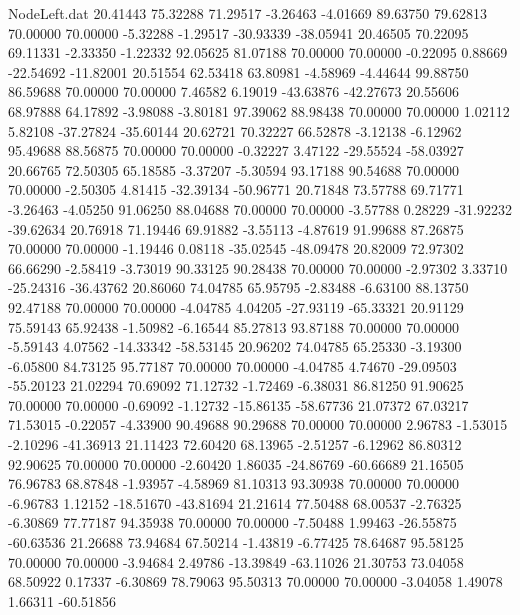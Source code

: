 \begin{filecontents}{NodeLeft.dat}
  20.41443   75.32288   71.29517    -3.26463   -4.01669   89.63750   79.62813   70.00000   70.00000   -5.32288   -1.29517  -30.93339  -38.05941
  20.46505   70.22095   69.11331    -2.33350   -1.22332   92.05625   81.07188   70.00000   70.00000   -0.22095    0.88669  -22.54692  -11.82001
  20.51554   62.53418   63.80981    -4.58969   -4.44644   99.88750   86.59688   70.00000   70.00000    7.46582    6.19019  -43.63876  -42.27673
  20.55606   68.97888   64.17892    -3.98088   -3.80181   97.39062   88.98438   70.00000   70.00000    1.02112    5.82108  -37.27824  -35.60144
  20.62721   70.32227   66.52878    -3.12138   -6.12962   95.49688   88.56875   70.00000   70.00000   -0.32227    3.47122  -29.55524  -58.03927
  20.66765   72.50305   65.18585    -3.37207   -5.30594   93.17188   90.54688   70.00000   70.00000   -2.50305    4.81415  -32.39134  -50.96771
  20.71848   73.57788   69.71771    -3.26463   -4.05250   91.06250   88.04688   70.00000   70.00000   -3.57788    0.28229  -31.92232  -39.62634
  20.76918   71.19446   69.91882    -3.55113   -4.87619   91.99688   87.26875   70.00000   70.00000   -1.19446    0.08118  -35.02545  -48.09478
  20.82009   72.97302   66.66290    -2.58419   -3.73019   90.33125   90.28438   70.00000   70.00000   -2.97302    3.33710  -25.24316  -36.43762
  20.86060   74.04785   65.95795    -2.83488   -6.63100   88.13750   92.47188   70.00000   70.00000   -4.04785    4.04205  -27.93119  -65.33321
  20.91129   75.59143   65.92438    -1.50982   -6.16544   85.27813   93.87188   70.00000   70.00000   -5.59143    4.07562  -14.33342  -58.53145
  20.96202   74.04785   65.25330    -3.19300   -6.05800   84.73125   95.77187   70.00000   70.00000   -4.04785    4.74670  -29.09503  -55.20123
  21.02294   70.69092   71.12732    -1.72469   -6.38031   86.81250   91.90625   70.00000   70.00000   -0.69092   -1.12732  -15.86135  -58.67736
  21.07372   67.03217   71.53015    -0.22057   -4.33900   90.49688   90.29688   70.00000   70.00000    2.96783   -1.53015   -2.10296  -41.36913
  21.11423   72.60420   68.13965    -2.51257   -6.12962   86.80312   92.90625   70.00000   70.00000   -2.60420    1.86035  -24.86769  -60.66689
  21.16505   76.96783   68.87848    -1.93957   -4.58969   81.10313   93.30938   70.00000   70.00000   -6.96783    1.12152  -18.51670  -43.81694
  21.21614   77.50488   68.00537    -2.76325   -6.30869   77.77187   94.35938   70.00000   70.00000   -7.50488    1.99463  -26.55875  -60.63536
  21.26688   73.94684   67.50214    -1.43819   -6.77425   78.64687   95.58125   70.00000   70.00000   -3.94684    2.49786  -13.39849  -63.11026
  21.30753   73.04058   68.50922     0.17337   -6.30869   78.79063   95.50313   70.00000   70.00000   -3.04058    1.49078    1.66311  -60.51856

\end{filecontents}
